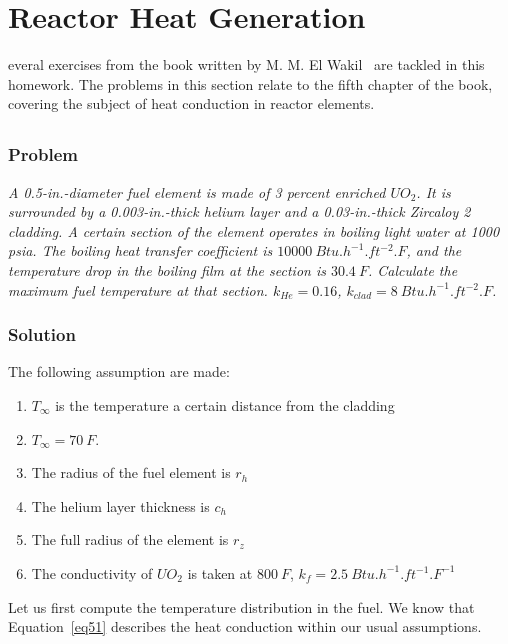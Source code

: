 %
%
\let\textcircled=\pgftextcircled
\chapter{Reactor Heat Generation}
\label{chap:intro}

everal exercises from the book written by M. M. El Wakil~\cite{book01} are tackled in this homework. The problems in this section relate to the fifth chapter of the book, covering the subject of heat conduction in reactor elements.

\section{}
\label{prob51}

\subsection{Problem}
\textit{A 0.5-in.-diameter fuel element is made of 3 percent enriched $UO_2$. It is surrounded by a 0.003-in.-thick helium layer and a 0.03-in.-thick Zircaloy 2 cladding. A certain section of the element operates in boiling light water at 1000 psia. The boiling heat transfer coefficient is $10000\ Btu.h^{-1}.ft^{-2}.F$, and the temperature drop in the boiling film at the section is $30.4\ F$. Calculate the maximum fuel temperature at that section. $k_{He}=0.16$, $k_{clad} = 8\ Btu.h^{-1}.ft^{-2}.F$.}

\subsection{Solution}


The following assumption are made:

\begin{enumerate}
\item $T_{\infty}$ is the temperature a certain distance from the cladding
\item $T_{\infty} = 70\ F$.
\item The radius of the fuel element is $r_h$
\item The helium layer thickness is $c_h$
\item The full radius of the element is $r_z$
\item The conductivity of $UO_2$ is taken at $800\ F$, $k_f = 2.5\ Btu.h^{-1}.ft^{-1}.F^{-1}$
\end{enumerate}

Let us first compute the temperature distribution in the fuel. We know that Equation~\ref{eq51} describes the heat conduction within our usual assumptions.

